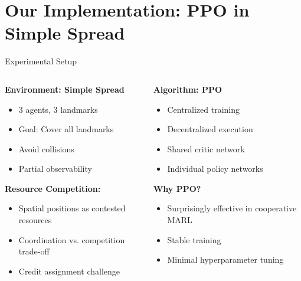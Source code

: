 \documentclass[aspectratio=169]{beamer}
\begin{document}
\section{Our Implementation: PPO in Simple Spread}

\begin{frame}{Experimental Setup}
    
    \begin{columns}
        \begin{column}{0.5\textwidth}
            \textbf{Environment: Simple Spread}
            \begin{itemize}
                \item 3 agents, 3 landmarks
                \item Goal: Cover all landmarks
                \item Avoid collisions
                \item Partial observability
            \end{itemize}
            
            \vfill
            \textbf{Resource Competition:}
            \begin{itemize}
                \item Spatial positions as contested resources
                \item Coordination vs. competition trade-off
                \item Credit assignment challenge
            \end{itemize}
        \end{column}
        \begin{column}{0.5\textwidth}
            \textbf{Algorithm: PPO}
            \begin{itemize}
                \item Centralized training
                \item Decentralized execution  
                \item Shared critic network
                \item Individual policy networks
            \end{itemize}
            
            \vfill
            \textbf{Why PPO?}
            \begin{itemize}
                \item Surprisingly effective in cooperative MARL \autocite{yu_surprising_2022}
                \item Stable training
                \item Minimal hyperparameter tuning
            \end{itemize}
        \end{column}
    \end{columns}
\end{frame}
\end{document}
